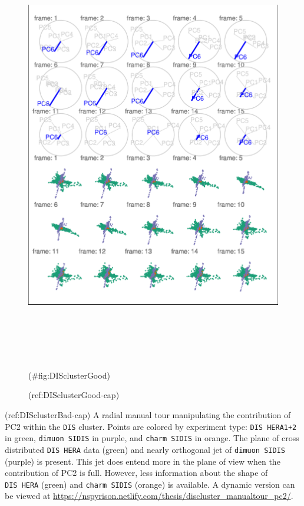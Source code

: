 \begin{Schunk}
\begin{figure}

{\centering \includegraphics[width=6in,height=7.2in]{spinifex_paper_files/figure-latex/DISclusterGood-1} 

}

\caption[(ref:DISclusterGood-cap)]{(ref:DISclusterGood-cap)}(\#fig:DISclusterGood)
\end{figure}
\end{Schunk}

(ref:DISclusterBad-cap) A radial manual tour manipulating the contribution of PC2 within the \texttt{DIS} cluster. Points are colored by experiment type: \texttt{DIS\ HERA1+2} in green, \texttt{dimuon\ SIDIS} in purple, and \texttt{charm\ SIDIS} in orange. The plane of cross distributed \texttt{DIS\ HERA} data (green) and nearly orthogonal jet of \texttt{dimuon\ SIDIS} (purple) is present. This jet does entend more in the plane of view when the contribution of PC2 is full. However, less information about the shape of \texttt{DIS\ HERA} (green) and \texttt{charm\ SIDIS} (orange) is available. A dynamic version can be viewed at \url{https://nspyrison.netlify.com/thesis/discluster_manualtour_pc2/}.

